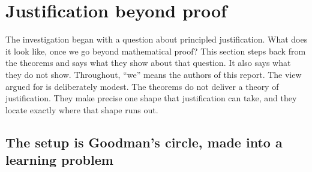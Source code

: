 \section{Justification beyond proof}\label{sec:philosophy}

The investigation began with a question about principled justification. What does it look like, once we go beyond mathematical proof? This section steps back from the theorems and says what they show about that question. It also says what they do not show. Throughout, ``we'' means the authors of this report. The view argued for is deliberately modest. The theorems do not deliver a theory of justification. They make precise one shape that justification can take, and they locate exactly where that shape runs out.

\subsection{The setup is Goodman's circle, made into a learning problem}\label{sec:philosophy:goodman}

